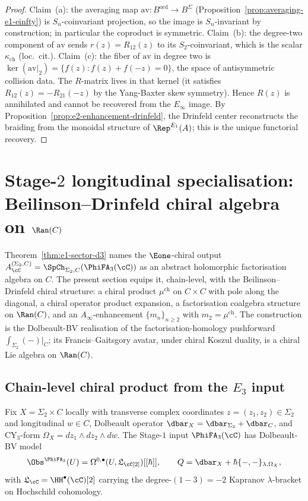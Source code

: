 \begin{proof}
Claim~(a): the averaging map $\mathrm{av} \colon B^{\mathrm{ord}} \to
B^\Sigma$ (Proposition~\ref{prop:averaging-e1-einfty}) is
$S_n$-coinvariant projection, so the image is $S_n$-invariant by
construction; in particular the coproduct is symmetric.
Claim~(b): the degree-two component of $\mathrm{av}$ sends
$r(z) = R_{12}(z)$ to its $S_2$-coinvariant, which is the scalar
$\kappa_{\mathrm{ch}}$ (loc.\ cit.).
Claim~(c): the fiber of $\mathrm{av}$ in degree two is
$\ker(\mathrm{av}|_2) = \{f(z) : f(z) + f(-z) = 0\}$, the space of
antisymmetric collision data. The $R$-matrix lives in that kernel
(it satisfies $R_{12}(z) = -R_{21}(-z)$ by the Yang-Baxter skew
symmetry). Hence $R(z)$ is annihilated and cannot be recovered from
the $E_\infty$ image. By
Proposition~\ref{prop:e2-enhancement-drinfeld}, the Drinfeld center
reconstructs the braiding from the monoidal structure of
$\Rep^{E_1}(A)$; this is the unique functorial recovery.
\end{proof}

\section{Stage-\texorpdfstring{$2$}{2} longitudinal specialisation: Beilinson--Drinfeld chiral algebra on \texorpdfstring{$\Ran(C)$}{Ran(C)}}
\label{sec:stage2-bd-chiral-ran}

Theorem~\ref{thm:e1-sector-d3} names the $\Eone$-chiral output $A_\cC^{(\Sigma_2,C)}=\SpCh_{\Sigma_2,C}(\PhiFA_3(\cC))$ as an abstract holomorphic factorisation algebra on $C$. The present section equips it, chain-level, with the Beilinson--Drinfeld chiral structure: a chiral product $\mu^{\mathrm{ch}}$ on $C\times C$ with pole along the diagonal, a chiral operator product expansion, a factorisation coalgebra structure on $\Ran(C)$, and an $A_\infty$-enhancement $\{m_n\}_{n\geq 2}$ with $m_2=\mu^{\mathrm{ch}}$. The construction is the Dolbeault-BV realisation of the factorisation-homology pushforward $\int_{\Sigma_2}(-)|_C$; its Francis--Gaitsgory avatar, under chiral Koszul duality, is a chiral Lie algebra on $\Ran(C)$.

\subsection{Chain-level chiral product from the \texorpdfstring{$E_3$}{E-3} input}
\label{subsec:stage2-chain-level-chiral-product}

Fix $X=\Sigma_2\times C$ locally with transverse complex coordinates $z=(z_1,z_2)\in\Sigma_2$ and longitudinal $w\in C$, Dolbeault operator $\dbar_X=\dbar_{\Sigma_2}+\dbar_C$, and CY$_3$-form $\Omega_X=dz_1\wedge dz_2\wedge dw$. The Stage-$1$ input $\PhiFA_3(\cC)$ has Dolbeault-BV model
\[
 \Obs^{\PhiFA_3}(U)=\Omega^{0,\bullet}(U,\mathfrak{L}_\cC[2])[[\hbar]],
 \qquad
 Q=\dbar_X+\hbar\{-,-\}_{\lambda,\Omega_X},
\]
with $\mathfrak{L}_\cC=\HH^\bullet(\cC)[2]$ carrying the degree-$(1-3)=-2$ Kapranov $\lambda$-bracket on Hochschild cohomology.

